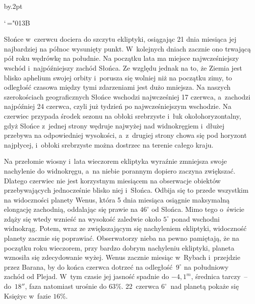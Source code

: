 

\advance\baselineskip by.2pt



{
\mathcode`\,="013B
  
Słońce w~czerwcu dociera do szczytu ekliptyki, osiągając 21 dnia miesiąca jej najbardziej na północ wysunięty punkt. W~kolejnych dniach zacznie ono trwającą pół roku wędrówkę na południe. Na początku lata ma miejsce najwcześniejszy wschód i~najpóźniejszy zachód Słońca. Ze względu jednak na to, że Ziemia jest blisko aphelium swojej orbity i~porusza się wolniej niż na początku zimy, to odległość czasowa między tymi zdarzeniami jest dużo mniejsza. Na naszych szerokościach geograficznych Słońce wschodzi najwcześniej 17 czerwca, a~zachodzi najpóźniej 24 czerwca, czyli już tydzień po najwcześniejszym wschodzie. Na czerwiec przypada środek sezonu na obłoki srebrzyste i~łuk okołohoryzontalny,
 gdyż Słońce z~jednej strony wędruje najwyżej nad widnokręgiem i~dłużej przebywa na odpowiedniej wysokości, a~z~drugiej strony chowa się pod horyzont najpłycej, i~obłoki srebrzyste można dostrzec na terenie całego kraju.

\vspace*{\parskip}
\begin{dwieszpalty}
Na przełomie wiosny i~lata wieczorem ekliptyka wyraźnie zmniejsza swoje nachylenie do widnokręgu, a~na niebie porannym dopiero zaczyna zwiększać. Dlatego czerwiec nie jest korzystnym miesiącem na obserwacje obiektów przebywających jednocześnie blisko niej i~Słońca. Odbija się to przede wszystkim na widoczności planety Wenus, która 5 dnia miesiąca osiągnie maksymalną elongację zachodnią, oddalając się prawie na $46^{\circ}$ od Słońca. Mimo tego o~świcie zdąży się wtedy wznieść na wysokość zaledwie około $5^{\circ}$ ponad wschodni widnokrąg. Potem, wraz ze zwiększającym się nachyleniem ekliptyki, widoczność planety zacznie się poprawiać. Obserwatorzy nieba na pewno pamiętają, że na początku roku wieczorem, przy bardzo dobrym nachyleniu ekliptyki, planeta wznosiła się zdecydowanie wyżej. Wenus zacznie miesiąc w~Rybach i~przejdzie przez Barana, by do końca czerwca dotrzeć na odległość~$9^{\circ}$ na południowy zachód od Plejad. W~tym czasie jej jasność spadnie do $-4,1^m$, średnica tarczy~-- do~$18''$, faza natomiast urośnie do $63\%$. 22~czerwca $6^{\circ}$~nad planetą pokaże się Księżyc w~fazie $16\%$.


\end{dwieszpalty}}
